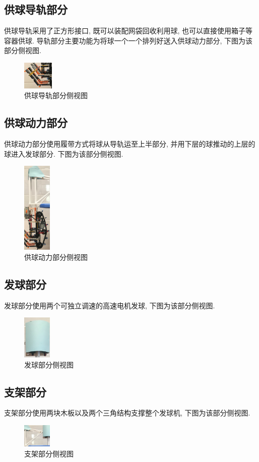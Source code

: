 \documentclass[UTF8]{ctexart}
\begin{document}
\subsection{\large 供球导轨部分}
供球导轨采用了正方形接口, 既可以装配网袋回收利用球, 也可以直接使用箱子等容器供球. 导轨部分主要功能为将球一个一个排列好送入供球动力部分, 下图为该部分侧视图.
\begin{figure}[H]
\centering
\includegraphics[width=0.13\textwidth]{rail.jpg}
\caption{供球导轨部分侧视图}
\end{figure}
\subsection{\large 供球动力部分}
供球动力部分使用履带方式将球从导轨运至上半部分, 并用下层的球推动的上层的球进入发球部分. 下图为该部分侧视图.
\begin{figure}[H]
\centering
\includegraphics[width=0.12\textwidth]{sport.jpg}
\caption{供球动力部分侧视图}
\end{figure}
\subsection{\large 发球部分}
发球部分使用两个可独立调速的高速电机发球, 下图为该部分侧视图.
\begin{figure}[H]
\centering
\includegraphics[width=0.12\textwidth]{eject.jpg}
\caption{发球部分侧视图}
\end{figure}
\subsection{\large 支架部分}
支架部分使用两块木板以及两个三角结构支撑整个发球机, 下图为该部分侧视图.
\begin{figure}[H]
\centering
\includegraphics[width=0.12\textwidth]{support.jpg}
\caption{支架部分侧视图}
\end{figure}
\end{document}
